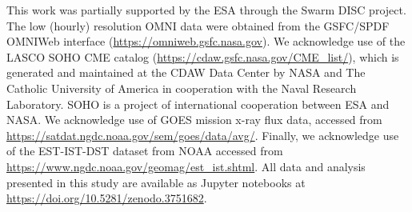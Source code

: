 \documentclass[draft,linenumbers]{agujournal2018}
\begin{document}
%
%
%
%
%
%
%
%


\acknowledgments
This work was partially supported by the ESA through the Swarm DISC project. The low (hourly) resolution OMNI data were obtained from the GSFC/SPDF OMNIWeb interface (\url{https://omniweb.gsfc.nasa.gov}). We acknowledge use of the LASCO SOHO CME catalog (\url{https://cdaw.gsfc.nasa.gov/CME\_list/}), which is generated and maintained at the CDAW Data Center by NASA and The Catholic University of America in cooperation with the Naval Research Laboratory. SOHO is a project of international cooperation between ESA and NASA. We acknowledge use of GOES mission x-ray flux data, accessed from \url{https://satdat.ngdc.noaa.gov/sem/goes/data/avg/}. Finally, we acknowledge use of the EST-IST-DST dataset from NOAA accessed from \url{https://www.ngdc.noaa.gov/geomag/est\_ist.shtml}. All data and analysis presented in this study are available as Jupyter notebooks at \url{https://doi.org/10.5281/zenodo.3751682}.



%

%





\end{document}

